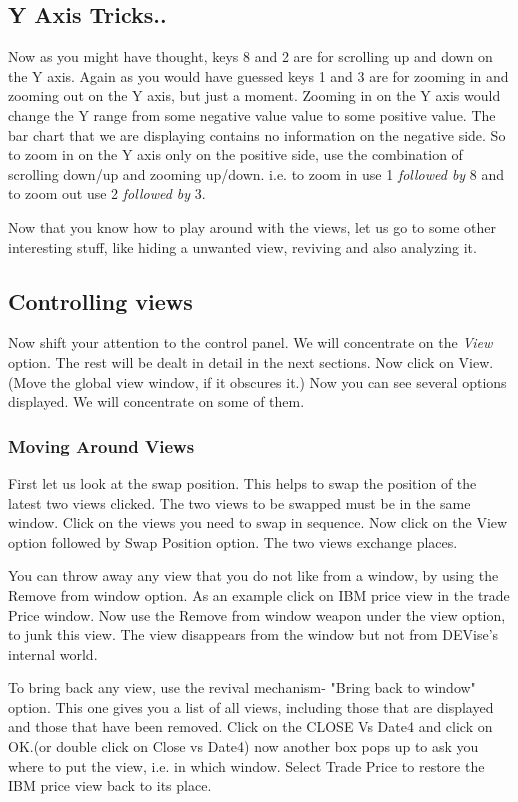 \subsection{ Y Axis Tricks..}


	Now as you might have thought, keys 8 and 2 are for scrolling up and down on the Y axis. Again as you would have guessed keys 1 and 3 are for zooming in and zooming out on the Y axis, but just a moment. Zooming in on the Y axis would change the Y range from some negative value  value to some positive value. The bar chart that we are displaying contains no information on the negative side. So to zoom in on the Y axis only on the positive side, use the combination of scrolling down/up and zooming up/down. i.e. to zoom in  use 1 {\em followed by } 8 and to zoom out use 2 {\em followed by } 3.   


	Now that you know how to play around with the views, let us go to some other interesting stuff, like hiding a unwanted view, reviving and also analyzing it.

\subsection{Controlling views}

	Now shift your attention to the control panel. We will concentrate on the {\em View } option. The rest will be dealt in detail in the next sections. Now click on View. (Move the global view window, if it obscures it.) Now you can see several options displayed. We will concentrate on some of them.

\subsubsection{Moving Around Views}


	First let us look at the swap position. This helps to swap the position of the latest two views clicked. The two views to be swapped must be in the same window. Click on the views you need to swap in sequence. Now click on the View option followed by Swap Position option. The two views exchange places.


	You can throw away any view that you do not like from a window, by using the Remove from window option. As an example click on IBM price view in the trade Price window. Now use the Remove from window weapon under the view option, to junk this view. The view disappears from the window but not from DEVise's internal world.


	To bring back any view, use the revival mechanism- "Bring back to window" option. This one gives you a list of all views, including those that are displayed and those that have been removed. Click on the CLOSE Vs Date4 and click on OK.(or double click on Close vs Date4) now another box pops up to ask you where to put the view, i.e. in which window. Select Trade Price to restore the IBM price view back to its place. 

